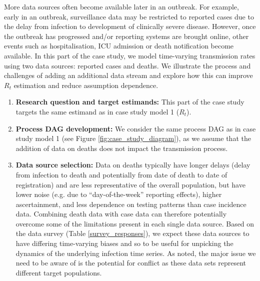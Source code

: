 \documentclass{article}
\begin{document}
More data sources often become available later in an outbreak. For example, early in an outbreak, surveillance data may be restricted to reported cases due to the delay from infection to development of clinically severe disease. However, once the outbreak has progressed and/or reporting systems are brought online, other events such as hospitalisation, \ac{ICU} admission or death notification become available. In this part of the case study, we model time-varying transmission rates using two data sources: reported cases and deaths. We illustrate the process and challenges of adding an additional data stream and explore how this can improve $R_t$ estimation and reduce assumption dependence.

\begin{enumerate}
   \item \textbf{Research question and target estimands:}  This part of the case study targets the same estimand as in case study model 1 ($R_t$). 
   
    \item \textbf{Process DAG development:} We consider the same process \ac{DAG} as in case study model 1 (see Figure \ref{fig:case_study_diagram}), as we assume that the addition of data on deaths does not impact the transmission process.
        
    \item \textbf{Data source selection:} Data on deaths typically have longer delays (delay from infection to death and potentially from date of death to date of registration) and are less representative of the overall population, but have lower noise (e.g. due to ``day-of-the-week'' reporting effects), higher ascertainment, and less dependence on testing patterns than case incidence data. Combining death data with case data can therefore potentially overcome some of the limitations present in each single data source. Based on the data survey (Table \ref{survey_responses}), we expect these data sources to have differing time-varying biases and so to be useful for unpicking the dynamics of the underlying infection time series. As noted, the major issue we need to be aware of is the potential for conflict as these data sets represent different target populations.
    

\end{enumerate}
\end{document}
